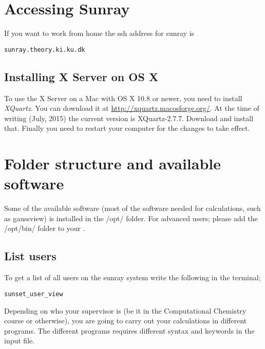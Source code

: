 \documentclass{article}
\begin{document}
\newpage
\section{Accessing Sunray}

If you want to work from home the ssh address for sunray is

\begin{lstlisting}
sunray.theory.ki.ku.dk
\end{lstlisting}



\subsection{Installing X Server on OS X}
To use the X Server on a Mac with OS X 10.8 or newer, you need to install \emph{XQuartz}. You
can download it at \url{http://xquartz.macosforge.org/}. At the time of
writing (July, 2015) the current version is XQuartz-2.7.7. Download and install that. Finally
you need to restart your computer for the changes to take effect. 



\newpage
\section{Folder structure and available software}

Some of the available software (most of the software needed for calculations, such as gaussview) is installed in the /opt/ folder. For advanced users; please add the /opt/bin/ folder to your .\\

\subsection*{List users}

To get a list of all users on the sunray system write the following in the terminal;

\begin{lstlisting}
sunset_user_view
\end{lstlisting}



Depending on who your supervisor is (be it in the Computational Chemistry course or otherwise), you are going to carry out your calculations in different programs.
The different programs requires different syntax and keywords in the input file.\\
\end{document}
